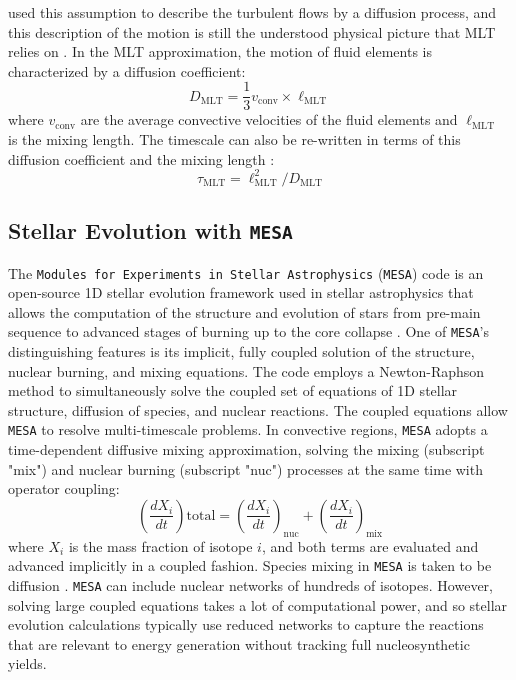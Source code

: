 \cite{prandtl7BerichtUber1925} used this assumption to describe the turbulent flows by a diffusion process, and this description of the motion is still the understood physical picture that MLT relies on \citep{joyceReviewMixingLength2023}.
In the MLT approximation, the motion of fluid elements is characterized by a diffusion coefficient:
\begin{equation}\label{eq:d_mlt}
    D_{\mathrm{MLT}} = \frac{1}{3}v_{\mathrm{conv}}\times\ell_{\mathrm{MLT}}
\end{equation}
where $v_{\mathrm{conv}}$ are the average convective velocities of the fluid elements and $\ell_{\mathrm{MLT}}$ is the mixing length.
The timescale can also be re-written in terms of this diffusion coefficient and the mixing length \citep{herwigCONVECTIVEREACTIVEPROTON2011}:
\begin{equation}\label{eq:t_mlt}
    \tau_{\mathrm{MLT}} = \ell_{\mathrm{MLT}}^2/D_{\mathrm{MLT}}
\end{equation}

\subsection{Stellar Evolution with \texttt{MESA}}

The \texttt{Modules for Experiments in Stellar Astrophysics} (\texttt{MESA}) code is an open-source 1D stellar evolution framework used in stellar astrophysics that allows the computation of the structure and evolution of stars from pre-main sequence to advanced stages of burning up to the core collapse \citep{paxtonMODULESEXPERIMENTSLAR2010}.
One of \texttt{MESA}’s distinguishing features is its implicit, fully coupled solution of the structure, nuclear burning, and mixing equations. 
The code employs a Newton-Raphson method to simultaneously solve the coupled set of equations of 1D stellar structure, diffusion of species, and nuclear reactions.
The coupled equations allow \texttt{MESA} to resolve multi-timescale problems.
In convective regions, \texttt{MESA} adopts a time-dependent diffusive mixing approximation, solving the mixing (subscript "mix") and nuclear burning (subscript "nuc") processes at the same time with operator coupling:
\begin{equation}
\left( \frac{dX_i}{dt} \right)\text{total} = \left( \frac{dX_i}{dt} \right)_\text{nuc} + \left( \frac{dX_i}{dt} \right)_\text{mix}
\end{equation}
where $X_i$ is the mass fraction of isotope $i$, and both terms are evaluated and advanced implicitly in a coupled fashion. 
Species mixing in \texttt{MESA} is taken to be diffusion \citep{paxtonMODULESEXPERIMENTSLAR2010}.
\texttt{MESA} can include nuclear networks of hundreds of isotopes.
However, solving large coupled equations takes a lot of computational power, and so stellar evolution calculations typically use reduced networks to capture the reactions that are relevant to energy generation without tracking full nucleosynthetic yields.

